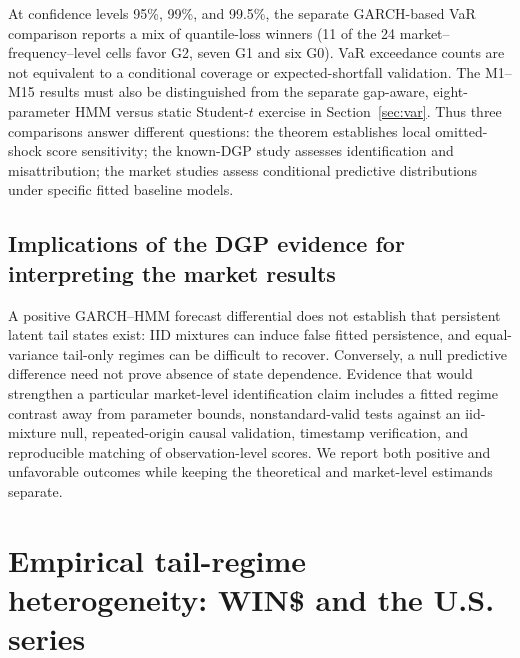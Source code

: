 \documentclass[11pt,a4paper]{article}
\begin{document}
At confidence levels 95\%, 99\%, and 99.5\%, the separate GARCH-based VaR comparison reports a mix of quantile-loss winners (11 of the 24 market--frequency--level cells favor G2, seven G1 and six G0). VaR exceedance counts are not equivalent to a conditional coverage or expected-shortfall validation. The M1--M15 results must also be distinguished from the separate gap-aware, eight-parameter HMM versus static Student-$t$ exercise in Section~\ref{sec:var}. Thus three comparisons answer different questions: the theorem establishes local omitted-shock score sensitivity; the known-DGP study assesses identification and misattribution; the market studies assess conditional predictive distributions under specific fitted baseline models.

\subsection{Implications of the DGP evidence for interpreting the market results}
A positive GARCH--HMM forecast differential does not establish that persistent latent tail states exist: IID mixtures can induce false fitted persistence, and equal-variance tail-only regimes can be difficult to recover. Conversely, a null predictive difference need not prove absence of state dependence. Evidence that would strengthen a particular market-level identification claim includes a fitted regime contrast away from parameter bounds, nonstandard-valid tests against an iid-mixture null, repeated-origin causal validation, timestamp verification, and reproducible matching of observation-level scores. We report both positive and unfavorable outcomes while keeping the theoretical and market-level estimands separate.

\section{Empirical tail-regime heterogeneity: WIN\$ and the U.S. series}\label{sec:emp}
\end{document}
